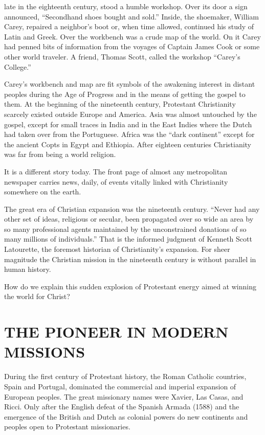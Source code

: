 
 late in the eighteenth century, stood a humble workshop. Over its
door a sign announced, “Secondhand shoes bought and sold.” Inside, the shoemaker, William Carey,
repaired a neighbor’s boot or, when time allowed, continued his study of Latin and Greek. Over the
workbench was a crude map of the world. On it Carey had penned bits of information from the voyages
of Captain James Cook or some other world traveler. A friend, Thomas Scott, called the workshop
“Carey’s College.”

Carey’s workbench and map are fit symbols of the awakening interest in distant peoples during the
Age of Progress and in the means of getting the gospel to them. At the beginning of the nineteenth
century, Protestant Christianity scarcely existed outside Europe and America. Asia was almost
untouched by the gospel, except for small traces in India and in the East Indies where the Dutch had
taken over from the Portuguese. Africa was the “dark continent” except for the ancient Copts in
Egypt and Ethiopia. After eighteen centuries Christianity was far from being a world religion.

It is a different story today. The front page of almost any metropolitan newspaper carries news,
daily, of events vitally linked with Christianity somewhere on the earth.

The great era of Christian expansion was the nineteenth century. “Never had any other set of ideas,
religious or secular, been propagated over so wide an area by so many professional agents maintained
by the unconstrained donations of so many millions of individuals.” That is the informed judgment of
Kenneth Scott Latourette, the foremost historian of Christianity’s expansion. For sheer magnitude
the Christian mission in the nineteenth century is without parallel in human history.

How do we explain this sudden explosion of Protestant energy aimed at winning the world for Christ?

\section{THE PIONEER IN MODERN MISSIONS}

During the first century of Protestant history, the Roman Catholic countries, Spain and Portugal,
dominated the commercial and imperial expansion of European peoples. The great missionary names were
Xavier, Las Casas, and Ricci. Only after the English defeat of the Spanish Armada (1588) and the
emergence of the British and Dutch as colonial powers do new continents and peoples open to
Protestant missionaries.

